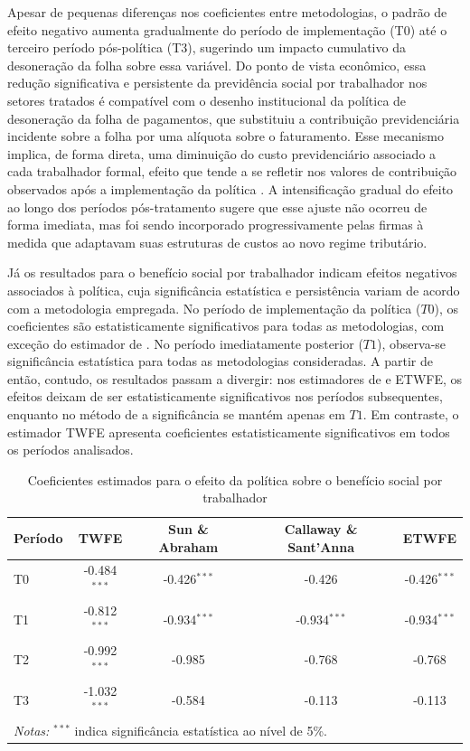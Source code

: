 \documentclass[12pt,a4paper,oneside]{article}
\begin{document}
		Apesar de pequenas diferenças nos coeficientes entre metodologias, o padrão de efeito negativo aumenta gradualmente do período de implementação (T0) até o terceiro período pós-política (T3), sugerindo um impacto cumulativo da desoneração da folha sobre essa variável. Do ponto de vista econômico, essa redução significativa e persistente da previdência social por trabalhador nos setores tratados é compatível com o desenho institucional da política de desoneração da folha de pagamentos, que substituiu a contribuição previdenciária incidente sobre a folha por uma alíquota sobre o faturamento. Esse mecanismo implica, de forma direta, uma diminuição do custo previdenciário associado a cada trabalhador formal, efeito que tende a se refletir nos valores de contribuição observados após a implementação da política . A intensificação gradual do efeito ao longo dos períodos pós-tratamento sugere que esse ajuste não ocorreu de forma imediata, mas foi sendo incorporado progressivamente pelas firmas à medida que adaptavam suas estruturas de custos ao novo regime tributário.
		
		Já os resultados para o benefício social por trabalhador indicam efeitos negativos associados à política, cuja significância estatística e persistência variam de acordo com a metodologia empregada. No período de implementação da política ($T0$), os coeficientes são estatisticamente significativos para todas as metodologias, com exceção do estimador de \citet{Callaway2021}. No período imediatamente posterior ($T1$), observa-se significância estatística para todas as metodologias consideradas. A partir de então, contudo, os resultados passam a divergir: nos estimadores de \citet{Callaway2021} e ETWFE, os efeitos deixam de ser estatisticamente significativos nos períodos subsequentes, enquanto no método de \cite{Sun2021} a significância se mantém apenas em $T1$. Em contraste, o estimador TWFE apresenta coeficientes estatisticamente significativos em todos os períodos analisados.
		
		
\begin{table}[H]
	\centering
	\caption{Coeficientes estimados para o efeito da política sobre o benefício social por trabalhador}
	\label{tab:beneficio_social}
	\begin{tabular}{lcccc}
		\hline
		\textbf{Período} & \textbf{TWFE} & \textbf{Sun \& Abraham} & \textbf{Callaway \& Sant'Anna} & \textbf{ETWFE} \\
		\hline
		T0 & -0.484$^{***}$ & -0.426$^{***}$ & -0.426 & -0.426$^{***}$ \\
		T1 & -0.812$^{***}$ & -0.934$^{***}$ & -0.934$^{***}$ & -0.934$^{***}$ \\
		T2 & -0.992$^{***}$ & -0.985 & -0.768 & -0.768 \\
		T3 & -1.032$^{***}$ & -0.584 & -0.113 & -0.113 \\
		\hline
		\multicolumn{5}{l}{\footnotesize \textit{Notas:} $^{***}$ indica significância estatística ao nível de 5\%.} \\
	\end{tabular}
\end{table}
\end{document}
